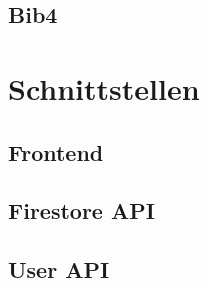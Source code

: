 \subsection{Bib4}
\sblindtext

\section{Schnittstellen}
\sblindtext
\subsection{Frontend}
\sblindtext
\subsection{Firestore API}
\sblindtext
\subsection{User API}
\sblindtext

